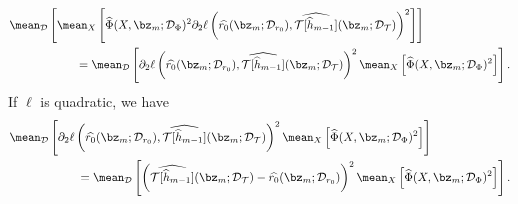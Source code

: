 \begin{description}[style=unboxed, leftmargin=0cm]
\begin{align*}
            &\mean_{ \data } \left[
                \mean_{ X } \left[
                    \hat{ \Phi } ( X, \bz_{ m } ; \mathcal{D}_{ \Phi } )^2
                    \partial_{ 2 } \loss \left(
                        \hat{ r_{ 0 } } ( \bz_{ m } ; \mathcal{D}_{ r_{ 0 } } ),
                        \hat{ \mathcal{T} [ \hat{ h }_{ m-1 } ] } ( \bz_{ m } ; \mathcal{D}_{ \mathcal{T} } )
                    \right)^2
                \right]
            \right] \\
            &\hspace{2cm}=
            \mean_{ \data } \left[
                \partial_{ 2 } \loss \left(
                    \hat{ r_{ 0 } } ( \bz_{ m } ; \mathcal{D}_{ r_{ 0 } } ),
                    \hat{ \mathcal{T} [ \hat{ h }_{ m-1 } ] } ( \bz_{ m } ; \mathcal{D}_{ \mathcal{T} } )
                \right)^2
                \mean_{ X } \left[
                    \hat{ \Phi } ( X, \bz_{ m } ; \mathcal{D}_{ \Phi } )^2
                \right]
            \right]
        .\end{align*}
        If $ \ell $ is quadratic, we have
        \begin{align*}
            &\mean_{ \data } \left[
                \partial_{ 2 } \loss \left(
                    \hat{ r_{ 0 } } ( \bz_{ m } ; \mathcal{D}_{ r_{ 0 } } ),
                    \hat{ \mathcal{T} [ \hat{ h }_{ m-1 } ] } ( \bz_{ m } ; \mathcal{D}_{ \mathcal{T} } )
                \right)^2
                \mean_{ X } \left[
                    \hat{ \Phi } ( X, \bz_{ m } ; \mathcal{D}_{ \Phi } )^2
                \right]
            \right] \\
            &\hspace{2cm}=
            \mean_{ \data } \left[
                \left(
                    \hat{ \mathcal{T} [ \hat{ h }_{ m-1 } ] } ( \bz_{ m } ; \mathcal{D}_{ \mathcal{T} } )
                    - \hat{ r_{ 0 } } ( \bz_{ m } ; \mathcal{D}_{ r_{ 0 } } )
                \right)^2
                \mean_{ X } \left[
                    \hat{ \Phi } ( X, \bz_{ m } ; \mathcal{D}_{ \Phi } )^2
                \right]
            \right]
        .\end{align*}


\end{description}
